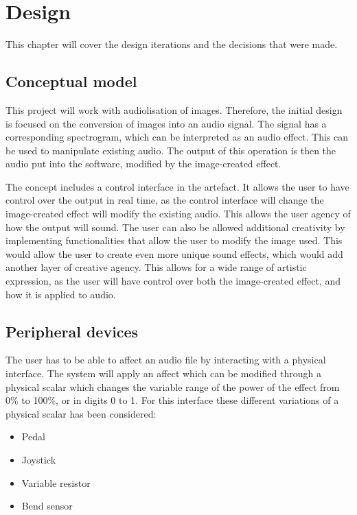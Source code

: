 \chapter{Design}\label{ch:design}
This chapter will cover the design iterations and the decisions that were made. 

\section{Conceptual model}
This project will work with audiolisation of images. Therefore, the initial design is focused on the conversion of images into an audio signal. The signal has a corresponding spectrogram, which can be interpreted as an audio effect. This can be used to manipulate existing audio. The output of this operation is then the audio put into the software, modified by the image-created effect.

The concept includes a control interface in the artefact. It allows the user to have control over the output in real time, as the control interface will change the image-created effect will modify the existing audio. This allows the user agency of how the output will sound. The user can also be allowed additional creativity by implementing functionalities that allow the user to modify the image used. This would allow the user to create even more unique sound effects, which would add another layer of creative agency. This allows for a wide range of artistic expression, as the user will have control over both the image-created effect, and how it is applied to audio.

\section{Peripheral devices}
The user has to be able to affect an audio file by interacting with a physical interface. The system will apply an affect which can be modified through a physical scalar which changes the variable range of the power of the effect from 0\% to 100\%, or in digits 0 to 1. For this interface these different variations of a physical scalar has been considered: 

\begin{itemize}
\item Pedal
\item Joystick
\item Variable resistor
\item Bend sensor
\end{itemize}

